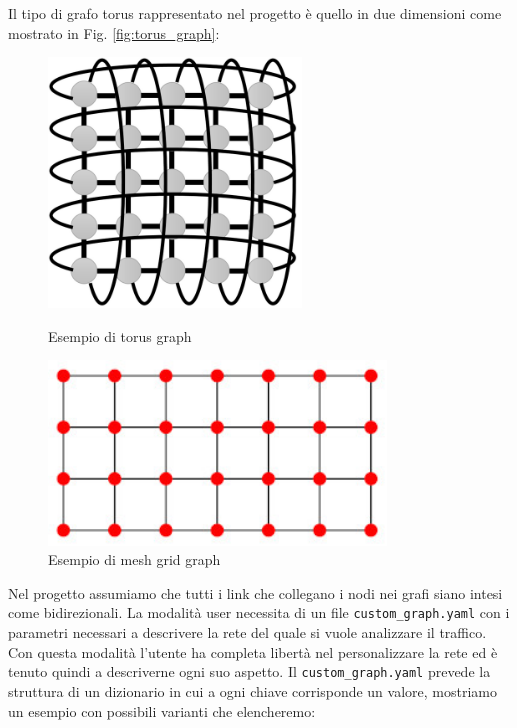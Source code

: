 \documentclass[binding=0.6cm]{sapthesis}
\begin{document}
Il tipo di grafo torus \cite{TorusWikipedia2024} rappresentato nel progetto è quello in due dimensioni come mostrato in Fig. \ref{fig:torus_graph}:

\begin{figure}[ht]
    \centering
    \begin{minipage}{0.48\textwidth}
        \centering
        \includegraphics[width=0.6\textwidth]{immagini/torus_graph.png}
        \caption{Esempio di torus graph \cite{torusgraph}}
        \label{fig:torus_graph}
    \end{minipage}\hfill
    \begin{minipage}{0.48\textwidth}
        \centering
        \includegraphics[width=0.8\textwidth]{immagini/GridGraph.jpg}
        \caption{Esempio di mesh grid graph \cite{MathWorldGridGraph}}
        \label{fig:grid_graph}
    \end{minipage}
\end{figure}



Nel progetto assumiamo che tutti i link che collegano i nodi nei grafi siano intesi come bidirezionali. 
La modalità user necessita di un file \texttt{custom\_graph.yaml} con i parametri 
necessari a descrivere la rete del quale si vuole analizzare il traffico. 
Con questa modalità l'utente ha completa libertà nel personalizzare la rete ed 
è tenuto quindi a descriverne ogni suo aspetto. Il \texttt{custom\_graph.yaml} prevede la 
struttura di un dizionario in cui a ogni chiave corrisponde un valore, mostriamo un esempio con possibili varianti che elencheremo:
\end{document}
